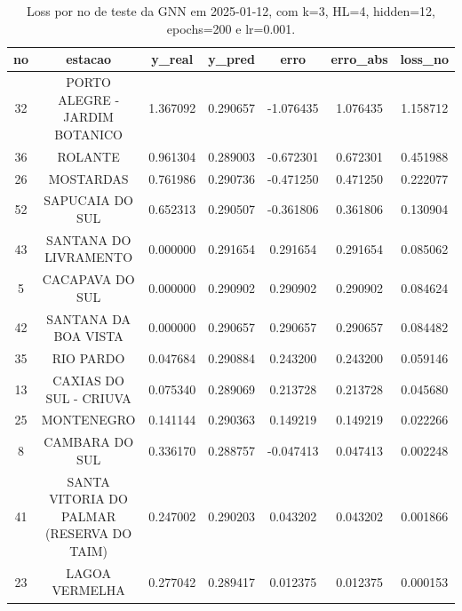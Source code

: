 \begin{table}[h]
\centering
\caption{Loss por no de teste da GNN em 2025-01-12, com k=3, HL=4, hidden=12, epochs=200 e lr=0.001.}
\label{tab:gnn_loss_k3_hl4_h12_e200_d20250112}
\begin{tabular}{ccccccc}
\toprule
no & estacao & y\_real & y\_pred & erro & erro\_abs & loss\_no \\
\midrule
32 & PORTO ALEGRE - JARDIM BOTANICO & 1.367092 & 0.290657 & -1.076435 & 1.076435 & 1.158712 \\
36 & ROLANTE & 0.961304 & 0.289003 & -0.672301 & 0.672301 & 0.451988 \\
26 & MOSTARDAS & 0.761986 & 0.290736 & -0.471250 & 0.471250 & 0.222077 \\
52 & SAPUCAIA DO SUL & 0.652313 & 0.290507 & -0.361806 & 0.361806 & 0.130904 \\
43 & SANTANA DO LIVRAMENTO & 0.000000 & 0.291654 & 0.291654 & 0.291654 & 0.085062 \\
5 & CACAPAVA DO SUL & 0.000000 & 0.290902 & 0.290902 & 0.290902 & 0.084624 \\
42 & SANTANA DA BOA VISTA & 0.000000 & 0.290657 & 0.290657 & 0.290657 & 0.084482 \\
35 & RIO PARDO & 0.047684 & 0.290884 & 0.243200 & 0.243200 & 0.059146 \\
13 & CAXIAS DO SUL - CRIUVA & 0.075340 & 0.289069 & 0.213728 & 0.213728 & 0.045680 \\
25 & MONTENEGRO & 0.141144 & 0.290363 & 0.149219 & 0.149219 & 0.022266 \\
8 & CAMBARA DO SUL & 0.336170 & 0.288757 & -0.047413 & 0.047413 & 0.002248 \\
41 & SANTA VITORIA DO PALMAR (RESERVA DO TAIM) & 0.247002 & 0.290203 & 0.043202 & 0.043202 & 0.001866 \\
23 & LAGOA VERMELHA & 0.277042 & 0.289417 & 0.012375 & 0.012375 & 0.000153 \\
\bottomrule
\end{tabular}
\end{table}
